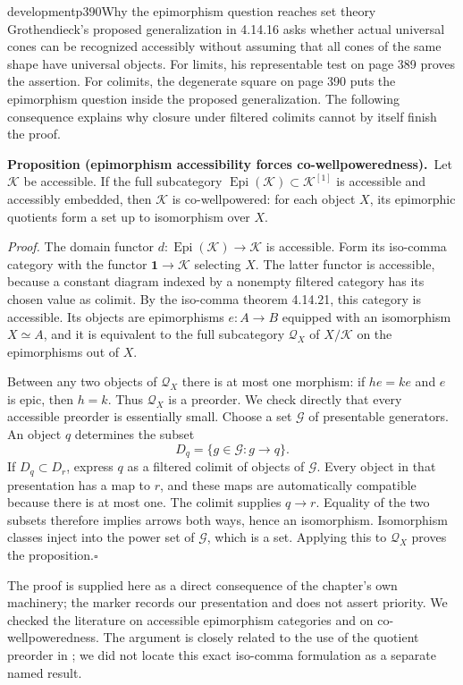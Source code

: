 \begin{dcomment}{development}{p390}{Why the epimorphism question reaches set theory}
Grothendieck's proposed generalization in 4.14.16 asks whether actual universal cones can be recognized accessibly without assuming that all cones of the same shape have universal objects. For limits, his representable test on page 389 proves the assertion. For colimits, the degenerate square on page 390 puts the epimorphism question inside the proposed generalization. The following consequence explains why closure under filtered colimits cannot by itself finish the proof.

\textbf{Proposition (epimorphism accessibility forces co-wellpoweredness).}\ours\ 
Let $\mathcal K$ be accessible. If the full subcategory $\operatorname{Epi}(\mathcal K)\subset\mathcal K^{[1]}$ is accessible and accessibly embedded, then $\mathcal K$ is co-wellpowered: for each object $X$, its epimorphic quotients form a set up to isomorphism over $X$.

\emph{Proof.} The domain functor $d:\operatorname{Epi}(\mathcal K)\to\mathcal K$ is accessible. Form its iso-comma category with the functor $\mathbf1\to\mathcal K$ selecting $X$. The latter functor is accessible, because a constant diagram indexed by a nonempty filtered category has its chosen value as colimit. By the iso-comma theorem 4.14.21, this category is accessible. Its objects are epimorphisms $e:A\to B$ equipped with an isomorphism $X\simeq A$, and it is equivalent to the full subcategory $\mathcal Q_X$ of $X/\mathcal K$ on the epimorphisms out of $X$.

Between any two objects of $\mathcal Q_X$ there is at most one morphism: if $h e=k e$ and $e$ is epic, then $h=k$. Thus $\mathcal Q_X$ is a preorder. We check directly that every accessible preorder is essentially small. Choose a set $\mathcal G$ of presentable generators. An object $q$ determines the subset
\[
 D_q=\{g\in\mathcal G:g\longrightarrow q\}.
\]
If $D_q\subset D_r$, express $q$ as a filtered colimit of objects of $\mathcal G$. Every object in that presentation has a map to $r$, and these maps are automatically compatible because there is at most one. The colimit supplies $q\to r$. Equality of the two subsets therefore implies arrows both ways, hence an isomorphism. Isomorphism classes inject into the power set of $\mathcal G$, which is a set. Applying this to $\mathcal Q_X$ proves the proposition.\hfill$\square$

The proof is supplied here as a direct consequence of the chapter's own machinery; the marker records our presentation and does not assert priority. We checked the literature on accessible epimorphism categories and on co-wellpoweredness. The argument is closely related to the use of the quotient preorder in \citet[Corollary~7.6]{BagariaCasacubertaMathiasRosicky2015}; we did not locate this exact iso-comma formulation as a separate named result.


\end{dcomment}
